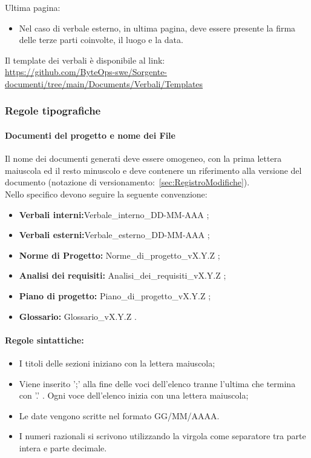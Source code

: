 \documentclass{article}
\begin{document}
Ultima pagina:
\begin{itemize}
    \item Nel caso di verbale esterno, in ultima pagina, deve essere presente la firma delle terze parti coinvolte, il luogo e la data.
\end{itemize}

Il template dei verbali è disponibile al link:\\ \href{https://github.com/ByteOps-swe/Sorgente-documenti/tree/main/Documents/Verbali/Templates}{https://github.com/ByteOps-swe/Sorgente-documenti/tree/main/Documents/Verbali/Templates}



\subsubsection{Regole tipografiche}
\paragraph*{Documenti del progetto e nome dei File}\label{sec:NomeFile}
Il nome dei documenti generati deve essere omogeneo, con la prima lettera maiuscola ed il resto minuscolo e deve contenere un riferimento alla versione del documento (notazione di versionamento:~\ref{sec:RegistroModifiche}).\\
Nello specifico devono seguire la seguente convenzione:
\begin{itemize}
    \item \textbf{Verbali interni:}Verbale\_interno\_DD-MM-AAA ;
    \item \textbf{Verbali esterni:}Verbale\_esterno\_DD-MM-AAA ;
    \item \textbf{Norme di Progetto:} Norme\_di\_progetto\_vX.Y.Z ;
    \item \textbf{Analisi dei requisiti:} Analisi\_dei\_requisiti\_vX.Y.Z ;
    \item \textbf{Piano di progetto:} Piano\_di\_progetto\_vX.Y.Z ;
    \item \textbf{Glossario:} Glossario\_vX.Y.Z .
\end{itemize}

\paragraph*{Regole sintattiche:}
\begin{itemize}
    \item I titoli delle sezioni iniziano con la lettera maiuscola;
    \item Viene inserito ';' alla fine delle voci dell'elenco tranne l'ultima che termina con '.' . Ogni voce dell'elenco inizia con una lettera maiuscola;
    \item  Le date vengono scritte nel formato GG/MM/AAAA.
    \item  I numeri razionali si scrivono utilizzando la virgola come separatore tra parte intera e parte decimale.
\end{itemize}
\end{document}
